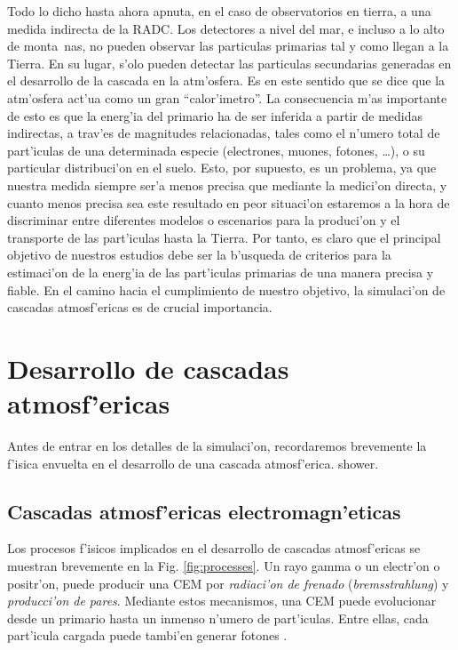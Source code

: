 Todo lo dicho hasta ahora apnuta, en el caso de observatorios en
tierra, a una medida indirecta de la RADC. Los detectores a nivel del
mar, e incluso a lo alto de monta~nas, no pueden observar las
particulas primarias tal y como llegan a la Tierra. En su lugar, s'olo
pueden detectar las particulas secundarias generadas en el desarrollo
de la cascada en la atm'osfera. Es en este sentido que se dice que la
atm'osfera act'ua como un gran ``calor'imetro''. La consecuencia m'as
importante de esto es que la energ'ia del primario ha de ser inferida
a partir de medidas indirectas, a trav'es de magnitudes relacionadas,
tales como el n'umero total de part'iculas de una determinada especie
(electrones, muones, fotones, \ldots), o su particular distribuci'on
en el suelo. Esto, por supuesto, es un problema, ya que nuestra medida
siempre ser'a menos precisa que mediante la medici'on directa, y
cuanto menos precisa sea este resultado en peor situaci'on estaremos a
la hora de discriminar entre diferentes modelos o escenarios para la
produci'on y el transporte de las part'iculas hasta la Tierra. Por
tanto, es claro que el principal objetivo de nuestros estudios debe
ser la b'usqueda de criterios para la estimaci'on de la energ'ia de
las part'iculas primarias de una manera precisa y fiable. En el camino
hacia el cumplimiento de nuestro objetivo, la simulaci'on de cascadas
atmosf'ericas es de crucial importancia.

\section{Desarrollo de cascadas atmosf'ericas} 

Antes de entrar en los detalles de la simulaci'on, recordaremos
brevemente la f'isica envuelta en el desarrollo de una cascada
atmosf'erica.  shower.

\subsection{Cascadas atmosf'ericas electromagn'eticas}

\toymodelfig
%
Los procesos f'isicos implicados en el desarrollo de cascadas
atmosf'ericas se muestran brevemente en la
Fig. \ref{fig:processes}. Un rayo gamma o un electr'on o positr'on,
puede producir una CEM por \emph{radiaci'on de frenado}
(\emph{bremsstrahlung}) y \emph{producci'on de pares}. Mediante estos
mecanismos, una CEM puede evolucionar desde un primario hasta un
inmenso n'umero de part'iculas. Entre ellas, cada part'icula cargada
puede tambi'en generar fotones \Cerenkov.


